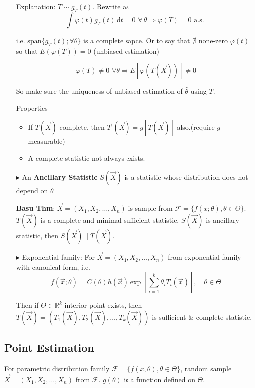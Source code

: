 \begin{itemize}
        Explanation: $T\sim g_T(t)$. Rewrite as
        \[
            \int\varphi (t) g_T(t)\,\mathrm{d} t=0  \,\,\forall\, \theta\Rightarrow\varphi(T)=0 \text{  a.s. }
        \]

        i.e. \underline{$\mathrm{span}\{g_T(t);\forall\theta\}$ is a complete sapce}. Or to say that $\nexists$ none-zero $\varphi(t)$ so that $E(\varphi(T))=0$ (unbiased estimation)

        \[
            \varphi(T)\neq 0 \,\,\forall \theta\Rightarrow E[\varphi(T(\vec{X}))]\neq 0  
        \]

        So make sure the uniqueness of unbiased estimation of $\hat{\theta}$ using $T$.

        Properties
        \begin{itemize}
            \item If $T(\vec{X})$ complete, then $T^\prime(\vec{X})=g[T(\vec{X})]$ also.(require $g$ measurable)

            \item A complete statistic not always exists.
        \end{itemize}
        \item[$\blacktriangleright$]  An \textbf{Ancillary Statistic} $S(\vec{X})$ is a statistic whose distribution does not depend on $\theta$
        
        \textbf{Basu Thm}: $\vec{X}=(X_1,X_2,\ldots,X_n)$ is sample from $\mathscr{F}=\{f(x;\theta),\theta\in\Theta\}$. $T(\vec{X})$ is a complete and minimal sufficient statistic, $S(\vec{X})$ is ancillary statistic, then $S(\vec{X})\parallel T(\vec{X})$.

        \item[$\blacktriangleright$] Exponential family: For $\vec{X}=(X_1,X_2,\ldots,X_n)$ from exponential family with canonical form, i.e.
    \[
        f(\vec{x};\theta)=C(\theta)h(\vec{x})\exp\left[\sum_{i=1}^k \theta_i T_i(\vec{x})\right] ,\quad \theta\in\Theta
    \]

    Then if $\Theta\in\mathbb{R}^k$ interior point exists, then $T(\vec{X})=(T_1(\vec{X}),T_2(\vec{X}),\ldots,T_k(\vec{X}))$ is sufficient \& complete statistic.


\end{itemize} 




\subsection{Point Estimation}\label{SectionPointEstimation}
    For parametric distribution family $\mathscr{F}=\{f(x,\theta),\theta\in\Theta\}$, random sample $\vec{X}=(X_1,X_2,\ldots,X_n)$ from $\mathscr{F}$. $g(\theta)$ is a function defined on $\Theta$. 

